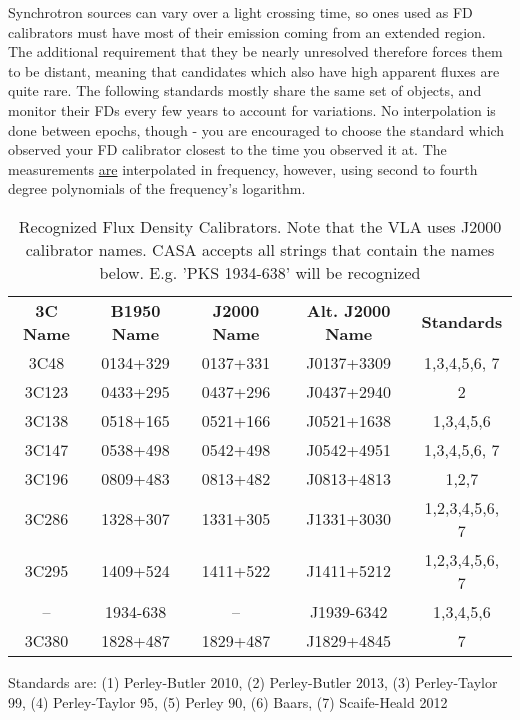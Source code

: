 Synchrotron sources can vary over a light crossing time, so ones used as FD
calibrators must have most of their emission coming from an extended region.
The additional requirement that they be nearly unresolved therefore forces them
to be distant, meaning that candidates which also have high apparent fluxes are
quite rare.  The following standards mostly share the same set of objects, and
monitor their FDs every few years to account for variations.  No interpolation
is done between epochs, though - you are encouraged to choose the standard
which observed your FD calibrator closest to the time you observed it at.
The measurements \underline{are} interpolated in frequency, however, using second to
fourth degree polynomials of the frequency's logarithm.

\begin{table}[h!]
\caption{Recognized Flux Density Calibrators. Note that the VLA uses
J2000 calibrator names. CASA accepts all strings that contain the
names below. E.g. 'PKS 1934-638' will be recognized
        {\label{table:conventions.fluxdensity.sources}}}
\begin{center}
\begin{tabular}{|ccccc|} \hline
 {\bf 3C Name}  & {\bf B1950 Name}& {\bf J2000 Name} & {\bf Alt. J2000
   Name} & {\bf Standards}\\
3C48  &  0134+329 &  0137+331 &  J0137+3309 & 1,3,4,5,6, 7  \\
3C123 &  0433+295 &  0437+296 &  J0437+2940 &      2 \\
3C138 &  0518+165 &  0521+166 &  J0521+1638 &      1,3,4,5,6\\
3C147 &  0538+498 &  0542+498 &  J0542+4951 &      1,3,4,5,6, 7\\
3C196 &  0809+483 &  0813+482 &  J0813+4813 &      1,2,7 \\
3C286 &  1328+307 &  1331+305 &  J1331+3030 &      1,2,3,4,5,6, 7\\
3C295 &  1409+524 &  1411+522 &  J1411+5212 &      1,2,3,4,5,6, 7\\
 --   &  1934-638 &    --     &  J1939-6342 &      1,3,4,5,6\\
3C380&   1828+487&   1829+487 &  J1829+4845&       7\\
\hline
\end{tabular}
\end{center}
Standards are: (1) Perley-Butler 2010, (2) Perley-Butler 2013, (3) Perley-Taylor 99, (4)
Perley-Taylor 95, (5) Perley 90, (6) Baars, (7) Scaife-Heald 2012
\end{table}




